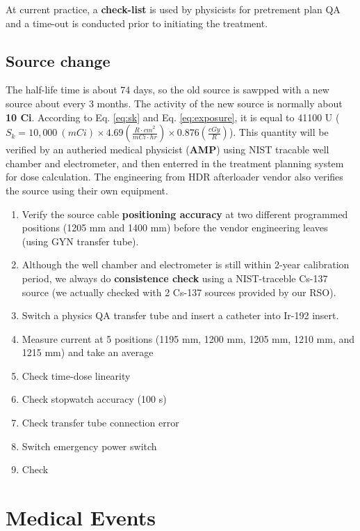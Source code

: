 \documentclass[]{book}
\providecommand{\tightlist}{%
  \setlength{\itemsep}{0pt}\setlength{\parskip}{0pt}}
\theoremstyle{definition}
\theoremstyle{definition}
\theoremstyle{definition}
\theoremstyle{remark}
\begin{document}
At current practice, a \textbf{check-list} is used by physicists for
pretrement plan QA and a time-out is conducted prior to initiating the
treatment.

\subsection{Source change}\label{hdr-source-change}

The half-life time is about 74 days, so the old source is sawpped with a
new source about every 3 months. The activity of the new source is
normally about \textbf{10 Ci}. According to Eq. \eqref{eq:sk} and Eq.
\eqref{eq:exposure}, it is equal to 41100 U
(\(S_k = 10,000\ (mCi) \times 4.69 \left(\frac{{R\cdot cm}^2}{mCi\cdot hr} \right) \times 0.876 \left(\frac{cGy}{R}\right)\)).
This quantity will be verified by an autheried medical physicist
(\textbf{AMP}) using NIST tracable well chamber and electrometer, and
then enterred in the treatment planning system for dose calculation. The
engineering from HDR afterloader vendor also verifies the source using
their own equipment.

\begin{enumerate}
\def\labelenumi{\arabic{enumi}.}
\tightlist
\item
  Verify the source cable \textbf{positioning accuracy} at two different
  programmed positions (1205 mm and 1400 mm) before the vendor
  engineering leaves (using GYN transfer tube).
\item
  Although the well chamber and electrometer is still within 2-year
  calibration period, we always do \textbf{consistence check} using a
  NIST-traceble Cs-137 source (we actually checked with 2 Cs-137 sources
  provided by our RSO).
\item
  Switch a physics QA transfer tube and insert a catheter into Ir-192
  insert.
\item
  Measure current at 5 positions (1195 mm, 1200 mm, 1205 mm, 1210 mm,
  and 1215 mm) and take an average
\item
  Check time-dose linearity
\item
  Check stopwatch accuracy (100 s)
\item
  Check transfer tube connection error
\item
  Switch emergency power switch
\item
  Check
\end{enumerate}

\section{Medical Events}\label{medical-events}
\end{document}

